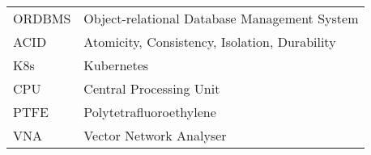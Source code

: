 
\seznamzkr

\begin{tabular}{ll}
ORDBMS & Object-relational Database Management System  \\
ACID & Atomicity, Consistency, Isolation, Durability \\
K8s & Kubernetes \\
CPU & Central Processing Unit \\
PTFE & Polytetrafluoroethylene \\
VNA & Vector Network Analyser \\
\end{tabular}

